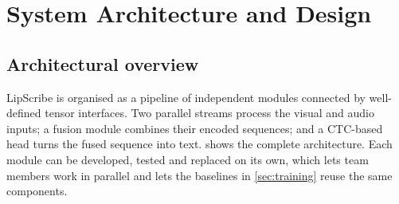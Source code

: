 \section{System Architecture and Design}
\label{sec:architecture}

\subsection{Architectural overview}
LipScribe is organised as a pipeline of independent modules connected by
well-defined tensor interfaces. Two parallel streams process the visual and
audio inputs; a fusion module combines their encoded sequences; and a
CTC-based head turns the fused sequence into text. 
shows the complete architecture. Each module can be developed, tested and
replaced on its own, which lets team members work in parallel and lets the
baselines in \cref{sec:training} reuse the same components.

